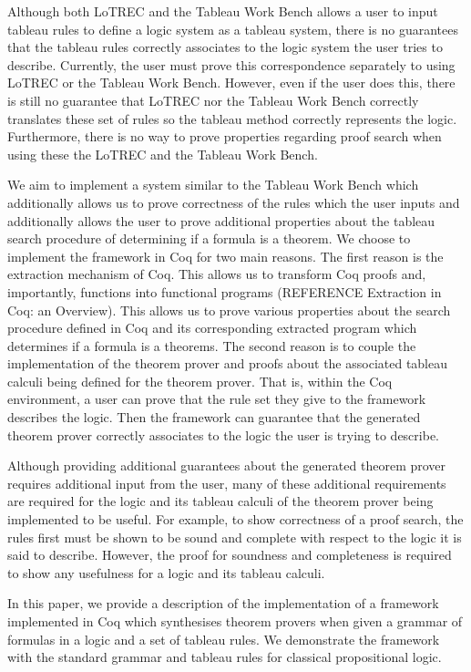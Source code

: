 \documentclass{llncs}
\begin{document}
Although both LoTREC and the Tableau Work Bench allows a user to input
tableau rules to define a logic system as a tableau system, there is no
guarantees that the tableau rules correctly associates to the logic system the
user tries to describe. Currently, the user must prove this correspondence
separately to using LoTREC or the Tableau Work Bench. However, even if the user
does this, there is still no guarantee that LoTREC nor the Tableau Work Bench
correctly translates these set of rules so the tableau method correctly
represents the logic. Furthermore, there is no way to prove properties
regarding proof search when using these the LoTREC and the Tableau Work Bench.

We aim to implement a system similar to the Tableau Work Bench which
additionally allows us to prove correctness of the rules which the user inputs
and additionally allows the user to prove additional properties about the
tableau search procedure of determining if a formula is a theorem. We choose
to implement the framework in Coq for two main reasons. The first reason is
the extraction mechanism of Coq. This allows us to transform Coq proofs and,
importantly, functions into functional programs (REFERENCE Extraction in Coq:
an Overview). This allows us to prove various properties about the search
procedure defined in Coq and its corresponding extracted program which
determines if a formula is a theorems. The second reason is to couple the
implementation of the theorem prover and proofs about the associated tableau
calculi being defined for the theorem prover. That is, within the Coq
environment, a user can prove that the rule set they give to the framework
describes the logic. Then the framework can guarantee that the generated
theorem prover correctly associates to the logic the user is trying to
describe.

Although providing additional guarantees about the generated theorem prover
requires additional input from the user, many of these additional requirements
are required for the logic and its tableau calculi of the theorem prover being
implemented to be useful. For example, to show correctness of a proof search,
the rules first must be shown to be sound and complete with respect to the
logic it is said to describe. However, the proof for soundness and completeness
is required to show any usefulness for a logic and its tableau calculi.

In this paper, we provide a description of the implementation of a framework
implemented in Coq which synthesises theorem provers when given a grammar of
formulas in a logic and a set of tableau rules. We demonstrate the framework
with the standard grammar and tableau rules for classical propositional logic.
\end{document}
